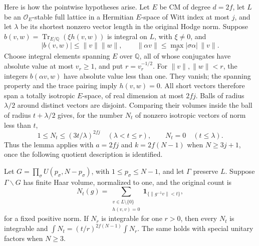 Here is how the pointwise hypotheses arise. Let $E$ be CM of degree
$d=2f$, let $L$ be an $\mathcal O_E$-stable full lattice in a Hermitian
$E$-space of Witt index at most $j$, and let $\lambda$ be its shortest
nonzero vector length in the original Hodge norm. Suppose
$b(v,w)=\operatorname{Tr}_{E/\mathbb Q}(\xi h(v,w))$ is integral on
$L$, with $\xi\ne0$, and
\[
 |b(v,w)|\le\|v\|\|w\|,\qquad
 \|\alpha v\|\le\max_\sigma|\sigma\alpha|\,\|v\|.
\]
Choose integral elements spanning $E$ over $\mathbb Q$, all of whose
conjugates have absolute value at most $v_r\ge1$, and put $r=v_r^{-1/2}$.
For $\|v\|,\|w\|<r$, the integers $b(\alpha v,w)$ have absolute
value less than one. They vanish; the spanning property and the trace
pairing imply $h(v,w)=0$. All short vectors therefore span a totally
isotropic $E$-space, of real dimension at most $2fj$. Balls of radius
$\lambda/2$ around distinct vectors are disjoint. Comparing their
volumes inside the ball of radius $t+\lambda/2$ gives, for the number
$N_t$ of nonzero isotropic vectors of norm less than $t$,
\[
 1\le N_t\le(3t/\lambda)^{2fj}\quad(\lambda<t\le r),
 \qquad N_t=0\quad(t\le\lambda).
\]
Thus the lemma applies with $a=2fj$ and $k=2f(N-1)$ when $N\ge3j+1$,
once the following quotient description is identified.

\begin{proposition}\label{prop:cusp-counting-haar}
Let $G=\prod_\sigma U(p_\sigma,N-p_\sigma)$, with
$1\le p_\sigma\le N-1$, and let $\Gamma$ preserve $L$.
Suppose $\Gamma\backslash G$ has finite Haar volume, normalized to one,
and the original count is
\[
 N_t(g)=\sum_{\substack{v\in L\setminus\{0\}\\h(v,v)=0}}
                  \mathbf1_{\{\|g^{-1}v\|<t\}},
\]
for a fixed positive norm. If $N_r$ is integrable for one $r>0$,
then every $N_t$ is integrable and
$\int N_t=(t/r)^{2f(N-1)}\int N_r$.
The same holds with special unitary factors when $N\ge3$.
\end{proposition}

